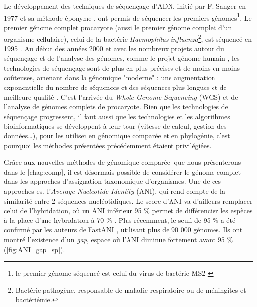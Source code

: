 Le développement des techniques de séquençage d'ADN, initié par F. Sanger en 1977 et sa méthode éponyme \cite{sanger_dna_1977}, ont permis de séquencer les premiers génomes\footnote{le premier génome séquencé est celui du virus de bactérie MS2 \cite{fiers_complete_1976}}. Le premier génome complet procaryote (aussi le premier génome complet d'un organisme cellulaire), celui de la bactérie \textit{Haemophilus influenza}\footnote{Bactérie pathogène, responsable de maladie respiratoire ou de méningites et bactériémie.}, est séquencé en 1995 \cite{fleischmann_whole-genome_1995}. Au début des années 2000 et avec les nombreux projets autour du séquençage et de l'analyse des génomes, comme le projet génome humain \cite{lander_initial_2001}, les technologies de séquençage sont de plus en plus précises et de moins en moins coûteuses, amenant dans la génomique "moderne" : une augmentation exponentielle du nombre de séquences et des séquences plus longues et de meilleure qualité \cite{hugenholtz_prokaryotic_2021,hu_next-generation_2021}. C'est l'arrivée du \textit{Whole Genome Sequencing} (WGS) et de l'analyse de génomes complets de procaryote. Bien que les technologies de séquençage progressent, il faut aussi que les technologies et les algorithmes bioinformatiques se développent à leur tour (vitesse de calcul, gestion des données\dots), pour les utiliser en génomique comparée et en phylogénie, c'est pourquoi les méthodes présentées précédemment étaient privilégiées.

Grâce aux nouvelles méthodes de génomique comparée, que nous présenterons dans le \autoref{chap:comp}, il est désormais possible de considérer le génome complet dans les approches d'assignation taxonomique d'organismes. Une de ces approches est l'\textit{Average Nucleotide Identity} (ANI), qui rend compte de la similarité entre 2 séquences nucléotidiques. Le score d'ANI va d'ailleurs remplacer celui de l'hybridation, où un ANI inférieur 95 \% permet de différencier les espèces à la place d'une hybridation à 70 \% \cite{goris_dnadna_2007}. Plus récemment, le seuil de 95 \% a été confirmé par les auteurs de FastANI \cite{jain_high_2018}, utilisant plus de 90 000 génomes. Ils ont montré l'existence d'un \textit{gap}, espace où l'ANI diminue fortement avant 95 \% (\autoref{fig:ANI_gap_sp}).


